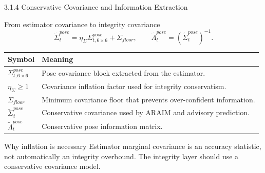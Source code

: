 \documentclass[10pt,aspectratio=169,xcolor=dvipsnames]{beamer}
\begin{document}
\begin{frame}{3.1.4 Conservative Covariance and Information Extraction}
  \small
  \begin{block}{From estimator covariance to integrity covariance}
    \[
      \tilde{\Sigma}^{pose}_t=\eta_{\Sigma}\Sigma^{pose}_{t,6\times6}+\Sigma_{floor},\qquad
      \tilde{\Lambda}^{pose}_t=\left(\tilde{\Sigma}^{pose}_t\right)^{-1}.
    \]
  \end{block}

  \begin{table}\scriptsize
    \begin{tabular}{p{} p{}}
      \toprule
      \textbf{Symbol} & \textbf{Meaning}\\
      \midrule
      $\Sigma^{pose}_{t,6\times6}$ & Pose covariance block extracted from the estimator.\\
      $\eta_{\Sigma}\ge 1$ & Covariance inflation factor used for integrity conservatism.\\
      $\Sigma_{floor}$ & Minimum covariance floor that prevents over-confident information.\\
      $\tilde{\Sigma}^{pose}_t$ & Conservative covariance used by ARAIM and advisory prediction.\\
      $\tilde{\Lambda}^{pose}_t$ & Conservative pose information matrix.\\
      \bottomrule
    \end{tabular}
  \end{table}

  \begin{alertblock}{Why inflation is necessary}
    \footnotesize Estimator marginal covariance is an accuracy statistic, not automatically an integrity overbound. The integrity layer should use a conservative covariance model.
  \end{alertblock}
\end{frame}
\end{document}

